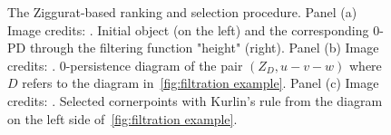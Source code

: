 \documentclass[english, LaM, oneside, noexaminfo]{sapthesis}
\begin{document}
\begin{figure}[tbp]
  \centering
		
  \caption{The Ziggurat-based ranking and selection procedure. Panel (a) Image credits: \cite{student01_my_bachel}. Initial object (on the left) and the corresponding $0$-PD through the filtering function "height" (right). Panel (b) Image credits: \cite{student01_my_bachel}. $0$-persistence diagram of the pair $(Z_D, u-v-w)$ where $D$ refers to the diagram in~\cref{fig:filtration example}. Panel (c) Image credits: \cite{student01_my_bachel}. Selected cornerpoints with Kurlin's rule from the diagram on the left side of~\cref{fig:filtration example}.}
  \label{fig:zigg_pipeline}
\end{figure}
\end{document}
